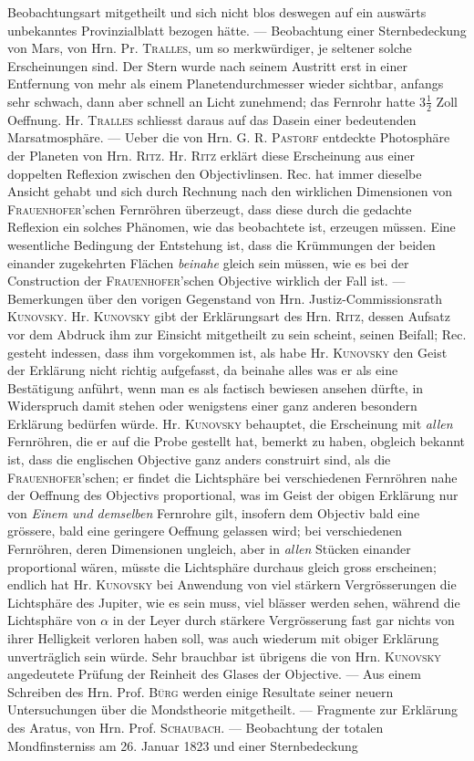 \noindent Beobachtungsart mitgetheilt und sich nicht blos deswegen auf ein auswärts unbekanntes Provinzialblatt bezogen hätte. --- Beobachtung einer Sternbedeckung von Mars, von Hrn. Pr. \textsc{Tralles}, um so merkwürdiger, je seltener solche Erscheinungen sind. Der Stern wurde nach seinem Austritt erst in einer Entfernung von mehr als einem Planetendurchmesser wieder sichtbar, anfangs sehr schwach, dann aber schnell an Licht zunehmend; das Fernrohr hatte $3\tfrac{1}{2}$ Zoll Oeffnung. Hr. \textsc{Tralles} schliesst daraus auf das Dasein einer bedeutenden Marsatmosphäre. --- Ueber die von Hrn. G. R. \textsc{Pastorf} entdeckte Photosphäre der Planeten von Hrn. \textsc{Ritz}. Hr. \textsc{Ritz} erklärt diese Erscheinung aus einer doppelten Reflexion zwischen den Objectivlinsen. Rec. hat immer dieselbe Ansicht gehabt und sich durch Rechnung nach den wirklichen Dimensionen von \textsc{Frauenhofer}'schen Fernröhren überzeugt, dass diese durch die gedachte Reflexion ein solches Phänomen, wie das beobachtete ist, erzeugen müssen. Eine wesentliche Bedingung der Entstehung ist, dass die Krümmungen der beiden einander zugekehrten Flächen \emph{beinahe} gleich sein müssen, wie es bei der Construction der \textsc{Frauenhofer}'schen Objective wirklich der Fall ist. --- Bemerkungen über den vorigen Gegenstand von Hrn. Justiz-Commissionsrath \textsc{Kunovsky}. Hr. \textsc{Kunovsky} gibt der Erklärungsart des Hrn. \textsc{Ritz}, dessen Aufsatz vor dem Abdruck ihm zur Einsicht mitgetheilt zu sein scheint, seinen Beifall; Rec. gesteht indessen, dass ihm vorgekommen ist, als habe Hr. \textsc{Kunovsky} den Geist der Erklärung nicht richtig aufgefasst, da beinahe alles was er als eine Bestätigung anführt, wenn man es als factisch bewiesen ansehen dürfte, in Widerspruch damit stehen oder wenigstens einer ganz anderen besondern Erklärung bedürfen würde. Hr. \textsc{Kunovsky} behauptet, die Erscheinung mit \emph{allen} Fernröhren, die er auf die Probe gestellt hat, bemerkt zu haben, obgleich bekannt ist, dass die englischen Objective ganz anders construirt sind, als die \textsc{Frauenhofer}'schen; er findet die Lichtsphäre bei verschiedenen Fernröhren nahe der Oeffnung des Objectivs proportional, was im Geist der obigen Erklärung nur von \emph{Einem und demselben} Fernrohre gilt, insofern dem Objectiv bald eine grössere, bald eine geringere Oeffnung gelassen wird; bei verschiedenen Fernröhren, deren Dimensionen ungleich, aber in \emph{allen} Stücken einander proportional wären, müsste die Lichtsphäre durchaus gleich gross erscheinen; endlich hat Hr. \textsc{Kunovsky} bei Anwendung von viel stärkern Vergrösserungen die Lichtsphäre des Jupiter, wie es sein muss, viel blässer werden sehen, während die Lichtsphäre von $\alpha$ in der Leyer durch stärkere Vergrösserung fast gar nichts von ihrer Helligkeit verloren haben soll, was auch wiederum mit obiger Erklärung unverträglich sein würde. Sehr brauchbar ist übrigens die von Hrn. \textsc{Kunovsky} angedeutete Prüfung der Reinheit des Glases der Objective. --- Aus einem Schreiben des Hrn. Prof. \textsc{Bürg} werden einige Resultate seiner neuern Untersuchungen über die Mondstheorie mitgetheilt. --- Fragmente zur Erklärung des Aratus, von Hrn. Prof. \textsc{Schaubach}. --- Beobachtung der totalen Mondfinsterniss am 26. Januar 1823 und einer Sternbedeckung 